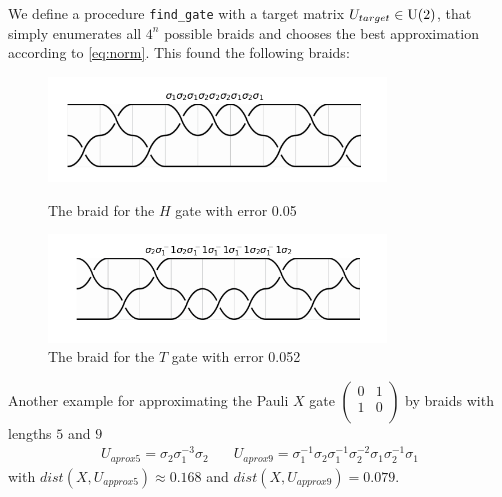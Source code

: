 \documentclass{article}
\begin{document}
We define a procedure \texttt{find_gate} with a target matrix $U_{target} \in \mathrm{U}(2)$, that simply enumerates all $4^n$ possible braids and chooses the best approximation according to \cref{eq:norm}. This found the following braids:
\setcounter{figure}{2}
\begin{figure}[h!]
  \centering
  \begin{minipage}{0.45\textwidth}
    \centering
      \includegraphics[width=0.8\textwidth]{images/H_braid.png}
      \caption{The braid for the $H$ gate with error 0.05}
      \label{fig:hbraid}
  \end{minipage}
  \hfill
  \begin{minipage}{0.45\textwidth}
      \centering
      \includegraphics[width=0.8\textwidth]{images/T_braid2.png}
      \caption{The braid for the $T$ gate with error 0.052}
      \label{fig:tbraid}
  \end{minipage}
\end{figure}

Another example for approximating the Pauli $X$ gate $\begin{pmatrix}
  0 &  1 \\
  1 &  0 \\
\end{pmatrix}$ by braids with lengths $5$ and $9$
\begin{align*}
  U_{aprox5} = \sigma_2 \sigma_1^{-3} \sigma_2 &\quad U_{aprox9} = \sigma_1^{-1}\sigma_2\sigma_1^{-1}\sigma_2^{-2}\sigma_1\sigma_2^{-1}\sigma_{1}
\end{align*}
with $dist(X,U_{approx5}) \approx 0.168$ and $dist(X,U_{approx9}) = 0.079$.
\end{document}
